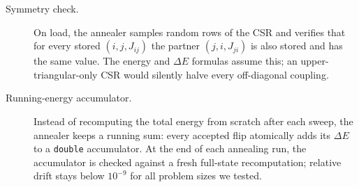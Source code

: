 \documentclass[reprint,twocolumn,amsmath,amssymb,nofootinbib]{revtex4-2}
\newcommand{\dE}{\Delta E}
\begin{document}
\begin{description}
\item[Symmetry check.] On load, the annealer samples random rows of the CSR and verifies that for every stored $(i, j, J_{ij})$ the partner $(j, i, J_{ji})$ is also stored and has the same value. The energy and $\dE$ formulas assume this; an upper-triangular-only CSR would silently halve every off-diagonal coupling.
\item[Running-energy accumulator.] Instead of recomputing the total energy from scratch after each sweep, the annealer keeps a running sum: every accepted flip atomically adds its $\dE$ to a \texttt{double} accumulator. At the end of each annealing run, the accumulator is checked against a fresh full-state recomputation; relative drift stays below $10^{-9}$ for all problem sizes we tested.
\end{description}
\end{document}
